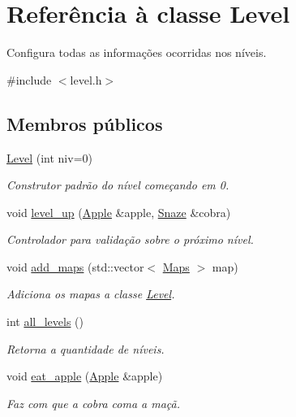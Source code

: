 \hypertarget{classLevel}{}\section{Referência à classe Level}
\label{classLevel}


Configura todas as informações ocorridas nos níveis.  




{\ttfamily \#include $<$level.\+h$>$}

\subsection*{Membros públicos}
\begin{DoxyCompactItemize}
\item 
\hyperlink{classLevel_a77d956a65bbff2de6e105e16f2792353}{Level} (int niv=0)
\begin{DoxyCompactList}\small\item\em Construtor padrão do nível começando em 0. \end{DoxyCompactList}\item 
void \hyperlink{classLevel_a843e6dc68560b09ea31b8650e916c088}{level\+\_\+up} (\hyperlink{classApple}{Apple} \&apple, \hyperlink{classSnaze}{Snaze} \&cobra)
\begin{DoxyCompactList}\small\item\em Controlador para validação sobre o próximo nível. \end{DoxyCompactList}\item 
void \hyperlink{classLevel_a0e39d944b4e0a37f25ad5de0a5e37492}{add\+\_\+maps} (std\+::vector$<$ \hyperlink{classMaps}{Maps} $>$ map)
\begin{DoxyCompactList}\small\item\em Adiciona os mapas a classe \hyperlink{classLevel}{Level}. \end{DoxyCompactList}\item 
int \hyperlink{classLevel_a27555723585164ed6258be2320e83458}{all\+\_\+levels} ()
\begin{DoxyCompactList}\small\item\em Retorna a quantidade de níveis. \end{DoxyCompactList}\item 
void \hyperlink{classLevel_a85a1a85f3d2a5e8438718e7438c383cd}{eat\+\_\+apple} (\hyperlink{classApple}{Apple} \&apple)
\begin{DoxyCompactList}\small\item\em Faz com que a cobra coma a maçã. \end{DoxyCompactList}\item 

\end{DoxyCompactItemize}
